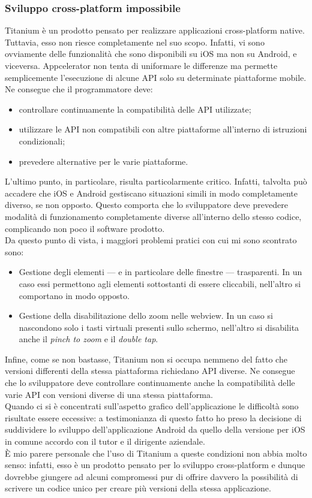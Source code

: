 			\subsubsection{Sviluppo cross-platform impossibile}
				Titanium è un prodotto pensato per realizzare applicazioni cross-platform native. Tuttavia, esso non riesce
				completamente nel suo scopo. Infatti, vi sono ovviamente delle funzionalità che sono disponibili su iOS ma non su
				Android, e viceversa. Appcelerator non tenta di uniformare le differenze ma permette semplicemente l'esecuzione di
				alcune API solo su determinate piattaforme mobile. Ne consegue che il programmatore deve:
				\begin{itemize}
					\item controllare continuamente la compatibilità delle API utilizzate;
					\item utilizzare le API non compatibili con altre piattaforme all'interno di istruzioni condizionali;
					\item prevedere alternative per le varie piattaforme.
				\end{itemize}
				L'ultimo punto, in particolare, risulta particolarmente critico. Infatti, talvolta può accadere che iOS e Android
				gestiscano situazioni simili in modo completamente diverso, se non opposto. Questo comporta che lo sviluppatore deve
				prevedere modalità di funzionamento completamente diverse all'interno dello stesso codice, complicando non poco il
				software prodotto.\\
				Da questo punto di vista, i maggiori problemi pratici con cui mi sono scontrato sono:
				\begin{itemize}
					\item Gestione degli elementi — e in particolare delle finestre — trasparenti. In un caso essi permettono
					agli elementi sottostanti di essere cliccabili, nell'altro si comportano in modo opposto.
					\item Gestione della disabilitazione dello zoom nelle webview. In un caso si nascondono solo i tasti virtuali
					presenti sullo schermo, nell'altro si disabilita anche il \emph{pinch to zoom} e il \emph{double tap}.
				\end{itemize}
				Infine, come se non bastasse, Titanium non si occupa nemmeno del fatto che versioni differenti della stessa
				piattaforma richiedano API diverse. Ne consegue che lo sviluppatore deve controllare continuamente anche 
				la compatibilità delle varie API con versioni diverse di una stessa piattaforma.\\
				Quando ci si è concentrati sull'aspetto grafico	dell'applicazione le difficoltà sono risultate essere eccessive: a
				testimonianza di questo fatto ho preso la decisione di suddividere lo sviluppo dell'applicazione Android da quello
				della versione per iOS in comune accordo con il tutor e il dirigente aziendale.\\
				È mio parere personale che l'uso di Titanium a queste condizioni non abbia molto senso: infatti, esso è un prodotto
				pensato per lo sviluppo cross-platform e dunque dovrebbe giungere ad alcuni compromessi pur di offrire davvero
				la possibilità di scrivere un codice unico per creare più versioni della stessa applicazione.

